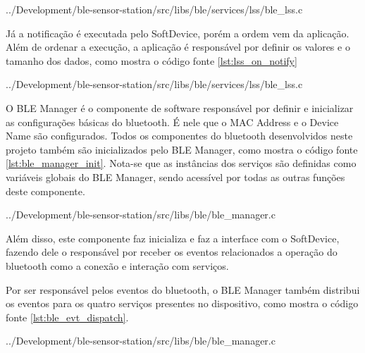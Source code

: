 \begin{minipage}{0.95\linewidth}  
 
{../Development/ble-sensor-station/src/libs/ble/services/lss/ble_lss.c}
\end{minipage}

Já a notificação é executada pelo SoftDevice, porém a ordem vem da aplicação.
Além de ordenar a execução, a aplicação é responsável por definir os valores e o
tamanho dos dados, como mostra o código fonte \ref{lst:lss_on_notify}

\begin{minipage}{0.95\linewidth}  
  
{../Development/ble-sensor-station/src/libs/ble/services/lss/ble_lss.c}
\end{minipage}


O BLE Manager é o componente de software responsável por definir e inicializar
as configurações básicas do bluetooth. É nele que o MAC Address e o Device Name
são configurados. Todos os componentes do bluetooth desenvolvidos neste projeto
também são inicializados pelo BLE Manager, como mostra o código fonte
\ref{lst:ble_manager_init}. Nota-se que as instâncias dos serviços são definidas
como variáveis globais do BLE Manager, sendo acessível por todas as outras
funções deste componente.

\begin{minipage}{0.95\linewidth} 
 
{../Development/ble-sensor-station/src/libs/ble/ble_manager.c}
\end{minipage}

Além disso, este componente faz inicializa e faz a interface
com o SoftDevice, fazendo dele o responsável por receber os eventos relacionados
a operação do bluetooth como a conexão e interação com serviços.

Por ser responsável pelos eventos do bluetooth, o BLE Manager também distribui
os eventos para os quatro serviços presentes no dispositivo, como mostra o
código fonte \ref{lst:ble_evt_dispatch}.

\begin{minipage}{0.95\linewidth} 
 {../Development/ble-sensor-station/src/libs/ble/ble_manager.c}
\end{minipage}


